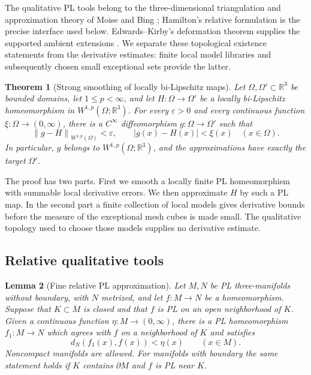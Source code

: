 \documentclass[11pt]{article}
\numberwithin{equation}{section}
\newtheorem{theorem}{Theorem}[section]
\newtheorem{lemma}[theorem]{Lemma}
\theoremstyle{definition}
\theoremstyle{remark}
\begin{document}
The qualitative PL tools belong to the three-dimensional triangulation
and approximation theory of Moise and Bing
\cite{Moise1952Approximation,Moise1952Triangulation,Bing1959}; Hamilton's
relative formulation \cite{Hamilton1976} is the precise interface used
below. Edwards--Kirby's deformation theorem supplies the supported
ambient extensions \cite{EdwardsKirby1971}. We separate these
topological existence statements from the derivative estimates:
finite local model libraries and subsequently chosen small exceptional
sets provide the latter.

\begin{theorem}[Strong smoothing of locally bi-Lipschitz maps]
\label{sm:smoothing}
Let $\Omega,\Omega'\subset\mathbb R^3$ be bounded domains, let
$1\le p<\infty$, and let $H:\Omega\to\Omega'$ be a locally
bi-Lipschitz homeomorphism in $W^{1,p}(\Omega;\mathbb R^3)$.  For every
$\varepsilon>0$ and every continuous function $\xi:\Omega\to(0,\infty)$,
there is a $C^\infty$ diffeomorphism $g:\Omega\to\Omega'$ such that
\begin{equation}
 \label{sm:smoothing-conclusion}
 \left\lVert g-H\right\rVert_{W^{1,p}(\Omega)}<\varepsilon,
 \qquad |g(x)-H(x)|<\xi(x)\quad(x\in\Omega).
\end{equation}
In particular, $g$ belongs to $W^{1,p}(\Omega;\mathbb R^3)$, and the
approximations have exactly the target $\Omega'$.
\end{theorem}

The proof has two parts.  First we smooth a locally finite PL
homeomorphism with summable local derivative errors.  We then approximate
$H$ by such a PL map.  In the second part a finite collection of local
models gives derivative bounds before the measure of the exceptional
mesh cubes is made small.  The qualitative topology used to choose those
models supplies no derivative estimate.

\subsection{Relative qualitative tools}

\begin{lemma}[Fine relative PL approximation]
\label{sm:relative-pl}
Let $M,N$ be PL three-manifolds without boundary, with $N$ metrized,
and let $f:M\to N$ be a homeomorphism.  Suppose that $K\subset M$ is
closed and that $f$ is PL on an open neighborhood of $K$.  Given a
continuous function $\eta:M\to(0,\infty)$, there is a PL
homeomorphism $f_1:M\to N$ which agrees with $f$ on a neighborhood of
$K$ and satisfies
\[
 d_N(f_1(x),f(x))<\eta(x)\qquad(x\in M).
\]
Noncompact manifolds are allowed.  For manifolds with boundary the same
statement holds if $K$ contains $\partial M$ and $f$ is PL near $K$.
\end{lemma}
\end{document}
